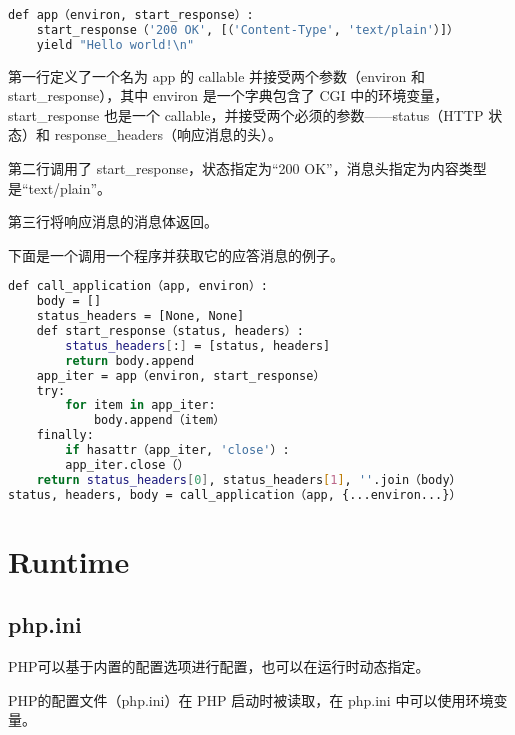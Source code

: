 \begin{lstlisting}[language=bash]
def app（environ, start_response）:
	start_response（'200 OK', [（'Content-Type', 'text/plain'）]）
	yield "Hello world!\n"
\end{lstlisting}


\begin{compactitem}
\item 第一行定义了一个名为 app 的 callable 并接受两个参数（environ 和 start\_response），其中 environ 是一个字典包含了 CGI 中的环境变量，start\_response 也是一个 callable，并接受两个必须的参数——status（HTTP 状态）和 response\_headers（响应消息的头）。
\item 第二行调用了 start\_response，状态指定为“200 OK”，消息头指定为内容类型是“text/plain”。
\item 第三行将响应消息的消息体返回。

\end{compactitem}

下面是一个调用一个程序并获取它的应答消息的例子。

\begin{lstlisting}[language=bash]
def call_application（app, environ）:
	body = []
	status_headers = [None, None]
	def start_response（status, headers）:
		status_headers[:] = [status, headers]
		return body.append
	app_iter = app（environ, start_response）
	try:
		for item in app_iter:
			body.append（item）
	finally:
		if hasattr（app_iter, 'close'）:
		app_iter.close（）
	return status_headers[0], status_headers[1], ''.join（body）
status, headers, body = call_application（app, {...environ...}）
\end{lstlisting}










\chapter{Runtime}




\section{php.ini}

PHP可以基于内置的配置选项进行配置，也可以在运行时动态指定。

PHP的配置文件（php.ini）在 PHP 启动时被读取，在 php.ini 中可以使用环境变量。

